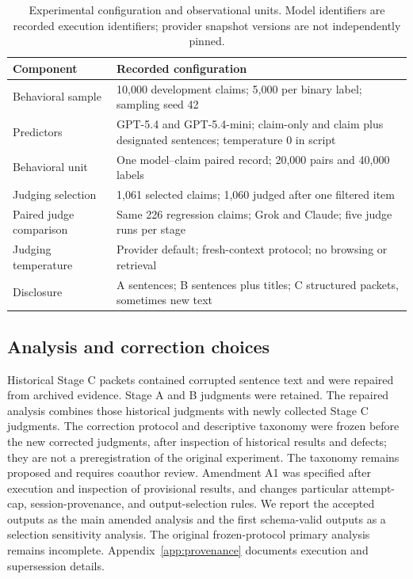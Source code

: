 \documentclass[11pt,letterpaper]{article}
\begin{document}
\begin{table}[H]\centering\small
\caption{Experimental configuration and observational units. Model identifiers are recorded execution identifiers; provider snapshot versions are not independently pinned.}\label{tab:config}
\begin{tabularx}{\linewidth}{lX}\toprule
Component & Recorded configuration \\\midrule
Behavioral sample & 10,000 development claims; 5,000 per binary label; sampling seed 42 \\
Predictors & GPT-5.4 and GPT-5.4-mini; claim-only and claim plus designated sentences; temperature 0 in script \\
Behavioral unit & One model--claim paired record; 20,000 pairs and 40,000 labels \\
Judging selection & 1,061 selected claims; 1,060 judged after one filtered item \\
Paired judge comparison & Same 226 regression claims; Grok and Claude; five judge runs per stage \\
Judging temperature & Provider default; fresh-context protocol; no browsing or retrieval \\
Disclosure & A sentences; B sentences plus titles; C structured packets, sometimes new text \\\bottomrule
\end{tabularx}
\end{table}

\subsection{Analysis and correction choices}\label{sec:analysis}
Historical Stage C packets contained corrupted sentence text and were repaired from archived evidence. Stage A and B judgments were retained. The repaired analysis combines those historical judgments with newly collected Stage C judgments. The correction protocol and descriptive taxonomy were frozen before the new corrected judgments, after inspection of historical results and defects; they are not a preregistration of the original experiment. The taxonomy remains proposed and requires coauthor review. Amendment A1 was specified after execution and inspection of provisional results, and changes particular attempt-cap, session-provenance, and output-selection rules. We report the accepted outputs as the main amended analysis and the first schema-valid outputs as a selection sensitivity analysis. The original frozen-protocol primary analysis remains incomplete. Appendix~\ref{app:provenance} documents execution and supersession details.
\end{document}

